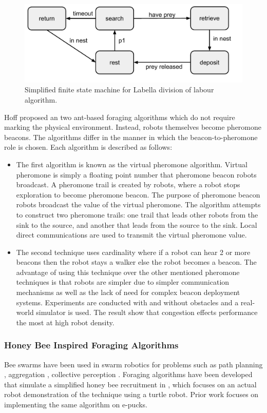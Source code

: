 \begin{figure}
\includegraphics[width=\textwidth]{chapters/chapter2/figures/LabellaFSM.pdf}
\caption{Simplified finite state machine for Labella division of labour algorithm. }
\end{figure} 

Hoff \cite{hoff2010two} proposed an two ant-based foraging algorithms which do not require marking the physical environment. Instead, robots themselves become pheromone beacons. The algorithms differ in the manner in which the beacon-to-pheromone role is chosen. Each algorithm is described as follows:

\begin{itemize}
\item The first algorithm is known as the virtual pheromone algorithm. Virtual pheromone is simply a floating point number that pheromone beacon robots broadcast. A pheromone trail is created by robots, where a robot stops exploration to become pheromone beacon. The purpose of pheromone beacon robots broadcast the value of the virtual pheromone. The algorithm attempts to construct two pheromone trails: one trail that leads other robots from the sink to the source, and another that leads from the source to the sink. Local direct communications are used to transmit the virtual pheromone value.

\item The second technique uses cardinality where if a robot can hear 2 or more beacons then the robot stays a walker else the robot becomes a beacon. The advantage of using this technique over the other mentioned pheromone techniques is that robots are simpler due to simpler communication mechanisms as well as the lack of need for complex beacon deployment systems. Experiments are conducted with and without obstacles and a real-world simulator is used. The result show that congestion effects performance the most at high robot density. 
\end{itemize}

\subsubsection{Honey Bee Inspired Foraging Algorithms}
Bee swarms have been used in swarm robotics for problems such as path planning \cite{lin2009chaotic}, aggregation \cite{kernbach2009re}, collective perception \cite{schmickl2007collective}. Foraging algorithms have been developed that simulate a simplified honey bee recruitment in \cite{alers2014biologically}, which focuses on an actual robot demonstration of the technique using a turtle robot. Prior work focuses on implementing the same algorithm on e-pucks. 


